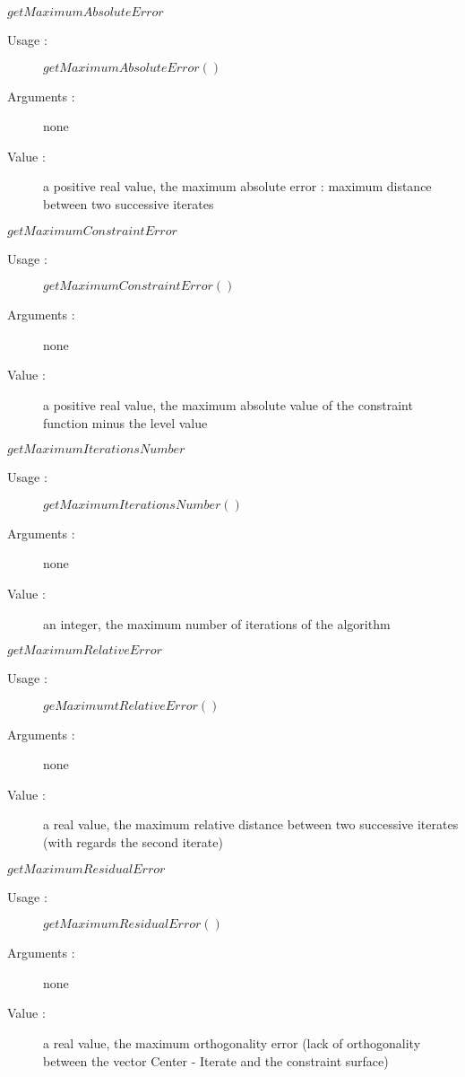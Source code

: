 \begin{description}
\begin{description}
  \item $getMaximumAbsoluteError$
    \begin{description}
    \item[Usage :] $getMaximumAbsoluteError()$
    \item[Arguments :] none
    \item[Value :] a positive real value, the maximum absolute error : maximum distance between two successive iterates
    \end{description}
    \bigskip

  \item $getMaximumConstraintError$
    \begin{description}
    \item[Usage :] $getMaximumConstraintError()$
    \item[Arguments :] none
    \item[Value :] a positive real value, the maximum absolute value of the constraint function minus the level value
    \end{description}
    \bigskip

  \item $getMaximumIterationsNumber$
    \begin{description}
    \item[Usage :] $getMaximumIterationsNumber()$
    \item[Arguments :] none
    \item[Value :] an integer, the maximum number of iterations of the algorithm
    \end{description}
    \bigskip

  \item $getMaximumRelativeError$
    \begin{description}
    \item[Usage :] $geMaximumtRelativeError()$
    \item[Arguments :] none
    \item[Value :] a real value, the maximum relative distance between two successive iterates (with regards the second iterate)
    \end{description}
    \bigskip

  \item $getMaximumResidualError$
    \begin{description}
    \item[Usage :] $getMaximumResidualError()$
    \item[Arguments :] none
    \item[Value :] a real value, the maximum orthogonality error (lack of orthogonality between the vector Center - Iterate and the constraint surface)
    \end{description}
    \bigskip


\end{description}
\end{description}
